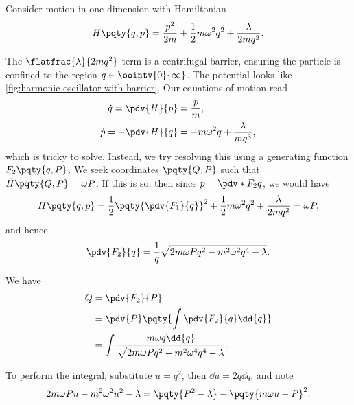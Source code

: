 \begin{example}
    Consider motion in one dimension with Hamiltonian
    \begin{equation}
        H\pqty{q, p} = \frac{p^2}{2m} + \frac{1}{2} m \omega^2 q^2 + \frac{\lambda}{2 m q^2}.
    \end{equation}

    The \(\flatfrac{\lambda}{2 m q^2}\) term is a centrifugal barrier, ensuring the particle is confined to the region \(q \in \oointv{0}{\infty}\). The potential looks like \autoref{fig:harmonic-oscillator-with-barrier}. Our equations of motion read
    \begin{subequations}
        \begin{align}
            \dot{q} = \pdv{H}{p} &= \frac{p}{m}, \\
            \dot{p} = - \pdv{H}{q} &= - m \omega^2 q + \frac{\lambda}{m q^3},
        \end{align}
    \end{subequations}
    which is tricky to solve. Instead, we try resolving this using a generating function \(F_2 \pqty{q, P}\). We seek coordinates \(\pqty{Q, P}\) such that \(\tilde{H}\pqty{Q, P} = \omega P\). If this is so, then since \(p = \pdv*{F_2}{q}\), we would have
    \begin{equation}
        H\pqty{q, p} = \frac{1}{2} \pqty{\pdv{F_1}{q}}^2 + \frac{1}{2} m \omega^2 q^2 + \frac{\lambda}{2 m q^2} = \omega P,
    \end{equation}
    and hence
    \begin{equation}
        \pdv{F_2}{q} = \frac{1}{q} \sqrt{2 m \omega P q^2 - m^2 \omega^2 q^4 - \lambda}.
    \end{equation}

    We have
    \begin{subequations}
        \begin{align}
            Q &= \pdv{F_2}{P} \\
            &= \pdv{P} \pqty{\int \pdv{F_2}{q} \dd{q}} \\
            &= \int \frac{m \omega q \dd{q}}{\sqrt{2 m \omega P q^2 - m^2 \omega^4 q^4 - \lambda}}.
        \end{align}
    \end{subequations}

    To perform the integral, substitute \(u = q^2\), then \(\dd{u} = 2 q \dd{q}\), and note
    \begin{equation}
        2 m \omega P u - m^2 \omega^2 u^2 - \lambda = \pqty{P^2 - \lambda} - \pqty{m \omega u - P}^2.
    \end{equation}
    

\end{example}

